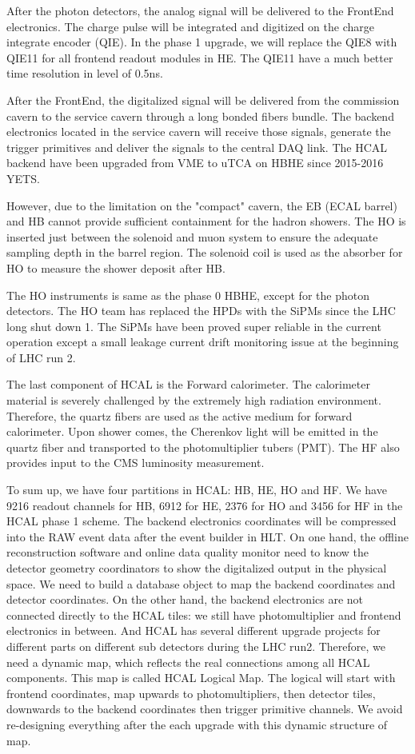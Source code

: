 After the photon detectors, the analog signal will be delivered to the FrontEnd electronics. The charge pulse will be integrated and digitized on the charge integrate encoder (QIE). In the phase 1 upgrade, we will replace the QIE8 with QIE11 for all frontend readout modules in HE. The QIE11 have a much better time resolution in level of 0.5ns. 

After the FrontEnd, the digitalized signal will be delivered from the commission cavern to the service cavern through a long bonded fibers bundle. The backend electronics located in the service cavern will receive those signals, generate the trigger primitives and deliver the signals to the central DAQ link. The HCAL backend have been upgraded from VME to uTCA on HBHE since 2015-2016 YETS\cite{CMS:2012tda}. 

However, due to the limitation on the "compact" cavern, the EB (ECAL barrel) and HB cannot provide sufficient containment for the hadron showers. The HO is inserted just between the solenoid and muon system to ensure the adequate sampling depth in the barrel region. The solenoid coil is used as the absorber for HO to measure the shower deposit after HB. 

The HO instruments is same as the phase 0 HBHE, except for the photon detectors. The HO team has replaced the HPDs with the SiPMs since the LHC long shut down 1. The SiPMs have been proved super reliable in the current operation except a small leakage current drift monitoring issue at the beginning of LHC run 2. 

The last component of HCAL is the Forward calorimeter. The calorimeter material is severely challenged by the extremely high radiation environment. Therefore, the quartz fibers are used as the active medium for forward calorimeter. Upon shower comes, the Cherenkov light will be emitted in the quartz fiber and transported to the photomultiplier tubers (PMT). The HF also provides input to the CMS luminosity measurement. 

To sum up, we have four partitions in HCAL: HB, HE, HO and HF. We have 9216 readout channels for HB, 6912 for HE, 2376 for HO and 3456 for HF in the HCAL phase 1 scheme. The backend electronics coordinates will be compressed into the RAW event data after the event builder in HLT. On one hand, the offline reconstruction software and online data quality monitor need to know the detector geometry coordinators to show the digitalized output in the physical space. We need to build a database object to map the backend coordinates and detector coordinates. On the other hand, the backend electronics are not connected directly to the HCAL tiles: we still have photomultiplier and frontend electronics in between. And HCAL has several different upgrade projects for different parts on different sub detectors during the LHC run2. Therefore, we need a dynamic map, which reflects the real connections among all HCAL components. This map is called HCAL Logical Map. The logical will start with frontend coordinates, map upwards to photomultipliers, then detector tiles, downwards to the backend coordinates then trigger primitive channels. We avoid re-designing everything after the each upgrade with this dynamic structure of map. 

